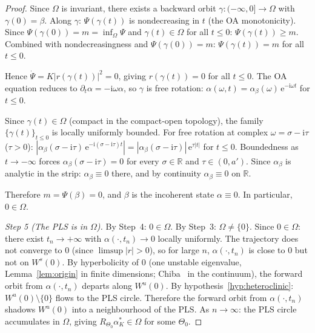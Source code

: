 \documentclass[11pt,a4paper]{article}
\theoremstyle{definition}
\newcommand{\R}{\mathbb{R}}
\begin{document}
\begin{proof}
Since $\Omega$ is invariant, there exists a backward orbit $\gamma: (-\infty, 0] \to \Omega$ with $\gamma(0) = \beta$. Along $\gamma$: $\Psi(\gamma(t))$ is nondecreasing in $t$ (the OA monotonicity). Since $\Psi(\gamma(0)) = m = \inf_\Omega \Psi$ and $\gamma(t) \in \Omega$ for all $t \leq 0$: $\Psi(\gamma(t)) \geq m$. Combined with nondecreasingness and $\Psi(\gamma(0)) = m$: $\Psi(\gamma(t)) = m$ for all $t \leq 0$.

Hence $\dot\Psi = K|r(\gamma(t))|^2 = 0$, giving $r(\gamma(t)) = 0$ for all $t \leq 0$. The OA equation reduces to $\partial_t\alpha = -\mathrm{i}\omega\alpha$, so $\gamma$ is free rotation: $\alpha(\omega, t) = \alpha_\beta(\omega)\,\mathrm{e}^{-\mathrm{i}\omega t}$ for $t \leq 0$.

Since $\gamma(t) \in \Omega$ (compact in the compact-open topology), the family $\{\gamma(t)\}_{t \leq 0}$ is locally uniformly bounded. For free rotation at complex $\omega = \sigma - \mathrm{i}\tau$ ($\tau > 0$): $|\alpha_\beta(\sigma - \mathrm{i}\tau)\,\mathrm{e}^{-\mathrm{i}(\sigma-\mathrm{i}\tau)t}| = |\alpha_\beta(\sigma-\mathrm{i}\tau)|\,\mathrm{e}^{\tau|t|}$ for $t \leq 0$. Boundedness as $t \to -\infty$ forces $\alpha_\beta(\sigma - \mathrm{i}\tau) = 0$ for every $\sigma \in \R$ and $\tau \in (0, a')$. Since $\alpha_\beta$ is analytic in the strip: $\alpha_\beta \equiv 0$ there, and by continuity $\alpha_\beta \equiv 0$ on $\R$.

Therefore $m = \Psi(\beta) = 0$, and $\beta$ is the incoherent state $\alpha \equiv 0$. In particular, $0 \in \Omega$.

\emph{Step 5 (The PLS is in $\Omega$).} By Step~4: $0 \in \Omega$. By Step~3: $\Omega \neq \{0\}$. Since $0 \in \Omega$: there exist $t_n \to +\infty$ with $\alpha(\cdot, t_n) \to 0$ locally uniformly. The trajectory does not converge to $0$ (since $\limsup|r| > 0$), so for large $n$, $\alpha(\cdot, t_n)$ is close to $0$ but not on $W^s(0)$. By hyperbolicity of $0$ (one unstable eigenvalue, Lemma~\ref{lem:origin} in finite dimensions; Chiba~\cite{chiba2015} in the continuum), the forward orbit from $\alpha(\cdot, t_n)$ departs along $W^u(0)$. By hypothesis~\ref{hyp:heteroclinic}: $W^u(0) \setminus \{0\}$ flows to the PLS circle. Therefore the forward orbit from $\alpha(\cdot, t_n)$ shadows $W^u(0)$ into a neighbourhood of the PLS. As $n \to \infty$: the PLS circle accumulates in $\Omega$, giving $R_{\Theta_0}\alpha^*_K \in \Omega$ for some $\Theta_0$.


\end{proof}
\end{document}
